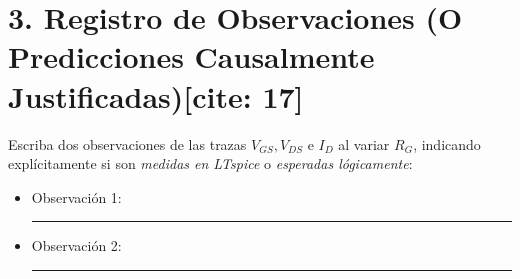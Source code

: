 \documentclass[11pt, a4paper]{article}
\begin{document}
\section*{3. Registro de Observaciones (O Predicciones Causalmente Justificadas)[cite: 17]}
Escriba dos observaciones de las trazas $V_{GS}, V_{DS}$ e $I_D$ al variar $R_G$, indicando explícitamente si son \textit{medidas en LTspice} o \textit{esperadas lógicamente}:
\begin{itemize}
    \item Observación 1: \rule{0.8\linewidth}{0.15mm}
    \item Observación 2: \rule{0.8\linewidth}{0.15mm}
\end{itemize}
\end{document}
